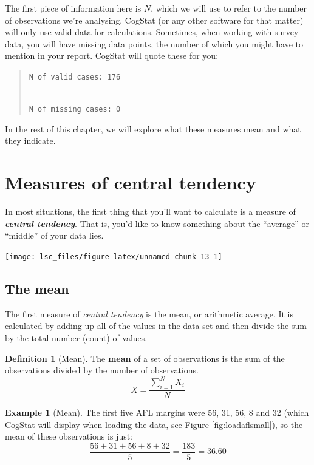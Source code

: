 \documentclass[
  11pt,
]{book}
\theoremstyle{definition}
\newtheorem{definition}{Definition}[chapter]
\theoremstyle{definition}
\newtheorem{example}{Example}[chapter]
\theoremstyle{definition}
\theoremstyle{definition}
\theoremstyle{remark}
\begin{document}
The first piece of information here is \(N\), which we will use to refer to the number of observations we're analysing. CogStat (or any other software for that matter) will only use valid data for calculations. Sometimes, when working with survey data, you will have missing data points, the number of which you might have to mention in your report. CogStat will quote these for you:

\begin{quote}
\texttt{N\ of\ valid\ cases:\ 176}\strut \\
\texttt{N\ of\ missing\ cases:\ 0}
\end{quote}

In the rest of this chapter, we will explore what these measures mean and what they indicate.

\hypertarget{centraltendency}{%
\section{Measures of central tendency}\label{centraltendency}}

In most situations, the first thing that you'll want to calculate is a measure of \textbf{\emph{central tendency}}. That is, you'd like to know something about the ``average'' or ``middle'' of your data lies.

\begin{center}\texttt{[image: lsc\_files/figure-latex/unnamed-chunk-13-1]} \end{center}

\hypertarget{mean}{%
\subsection{The mean}\label{mean}}

The first measure of \emph{central tendency} is the mean, or arithmetic average. It is calculated by adding up all of the values in the data set and then divide the sum by the total number (count) of values.

\begin{definition}[Mean]
\protect\hypertarget{def:defmean}{}\label{def:defmean}The \textbf{mean} of a set of observations is the sum of the observations divided by the number of observations.
\[
\bar{X} = \frac{\sum_{i=1}^N X_i}{N}
\]
\end{definition}

\begin{example}[Mean]
\protect\hypertarget{exm:exmean}{}\label{exm:exmean}The first five AFL margins were 56, 31, 56, 8 and 32 (which CogStat will display when loading the data, see Figure \ref{fig:loadaflsmall}), so the mean of these observations is just:
\[
\frac{56 + 31 + 56 + 8 + 32}{5} = \frac{183}{5} = 36.60
\]
\end{example}
\end{document}
